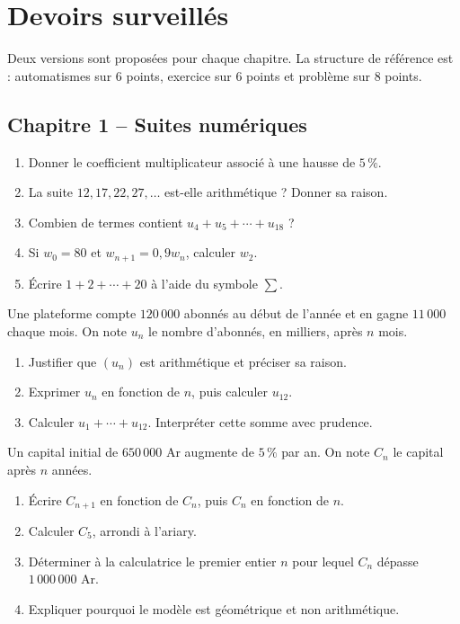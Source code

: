 \chapter{Devoirs surveillés}
Deux versions sont proposées pour chaque chapitre. La structure de référence est : automatismes sur 6 points, exercice sur 6 points et problème sur 8 points.
\section*{Chapitre 1 -- Suites numériques}
\begin{exercice}[1 -- Automatismes]
\begin{enumerate}
\item Donner le coefficient multiplicateur associé à une hausse de $5\,\%$.
\item La suite $12,17,22,27,\ldots$ est-elle arithmétique ? Donner sa raison.
\item Combien de termes contient $u_4+u_5+\cdots+u_{18}$ ?
\item Si $w_0=80$ et $w_{n+1}=0{,}9w_n$, calculer $w_2$.
\item Écrire $1+2+\cdots+20$ à l'aide du symbole $\sum$.
\end{enumerate}
\end{exercice}
\begin{exercice}[2 -- Abonnements]
Une plateforme compte $120\,000$ abonnés au début de l'année et en gagne $11\,000$ chaque mois. On note $u_n$ le nombre d'abonnés, en milliers, après $n$ mois.
\begin{enumerate}
\item Justifier que $(u_n)$ est arithmétique et préciser sa raison.
\item Exprimer $u_n$ en fonction de $n$, puis calculer $u_{12}$.
\item Calculer $u_1+\cdots+u_{12}$. Interpréter cette somme avec prudence.
\end{enumerate}
\end{exercice}
\begin{exercice}
Un capital initial de $650\,000$ Ar augmente de $5\,\%$ par an. On note $C_n$ le capital après $n$ années.
\begin{enumerate}
\item Écrire $C_{n+1}$ en fonction de $C_n$, puis $C_n$ en fonction de $n$.
\item Calculer $C_5$, arrondi à l'ariary.
\item Déterminer à la calculatrice le premier entier $n$ pour lequel $C_n$ dépasse $1\,000\,000$ Ar.
\item Expliquer pourquoi le modèle est géométrique et non arithmétique.
\end{enumerate}
\end{exercice}
